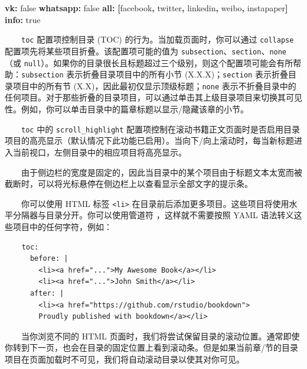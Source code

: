 \documentclass[
  12pt,
]{krantz}
\newenvironment{Shaded}{\begin{snugshade}}{\end{snugshade}}
\newcommand{\AttributeTok}[1]{\textcolor[rgb]{0.13,0.29,0.53}{#1}}
\newcommand{\CharTok}[1]{\textcolor[rgb]{0.31,0.60,0.02}{#1}}
\newcommand{\FunctionTok}[1]{\textcolor[rgb]{0.13,0.29,0.53}{\textbf{#1}}}
\newcommand{\KeywordTok}[1]{\textcolor[rgb]{0.13,0.29,0.53}{\textbf{#1}}}
\newcommand{\StringTok}[1]{\textcolor[rgb]{0.31,0.60,0.02}{#1}}
\theoremstyle{definition}
\theoremstyle{definition}
\theoremstyle{definition}
\theoremstyle{definition}
\theoremstyle{remark}
\begin{document}
\begin{Shaded}
\begin{Highlighting}[]
\AttributeTok{      }\FunctionTok{vk}\KeywordTok{:}\AttributeTok{ }\CharTok{false}
\AttributeTok{      }\FunctionTok{whatsapp}\KeywordTok{:}\AttributeTok{ }\CharTok{false}
\AttributeTok{      }\FunctionTok{all}\KeywordTok{:}\AttributeTok{ }\KeywordTok{[}\StringTok{\textquotesingle{}facebook\textquotesingle{}}\KeywordTok{,}\AttributeTok{ }\StringTok{\textquotesingle{}twitter\textquotesingle{}}\KeywordTok{,}\AttributeTok{ }\StringTok{\textquotesingle{}linkedin\textquotesingle{}}\KeywordTok{,}\AttributeTok{ }\StringTok{\textquotesingle{}weibo\textquotesingle{}}\KeywordTok{,}\AttributeTok{ }\StringTok{\textquotesingle{}instapaper\textquotesingle{}}\KeywordTok{]}
\AttributeTok{    }\FunctionTok{info}\KeywordTok{:}\AttributeTok{ }\CharTok{true}
\end{Highlighting}
\end{Shaded}

  \texttt{toc} 配置项控制目录 (TOC) 的行为。当加载页面时，你可以通过 \texttt{collapse} 配置项先将某些项目折叠。该配置项可能的值为 \texttt{subsection}、\texttt{section}、\texttt{none}（或 \texttt{null}）。如果你的目录很长且标题超过三个级别，则这个配置项可能会有所帮助：\texttt{subsection} 表示折叠目录项目中的所有小节 (X.X.X)；\texttt{section} 表示折叠目录项目中的所有节 (X.X)，因此最初仅显示顶级标题；\texttt{none} 表示不折叠目录中的任何项目。对于那些折叠的目录项目，可以通过单击其上级目录项目来切换其可见性。例如，你可以单击目录中的篇章标题以显示/隐藏该章的小节。

  \texttt{toc} 中的 \texttt{scroll\_highlight} 配置项控制在滚动书籍正文页面时是否启用目录项目的高亮显示（默认情况下此功能已启用）。当向下/向上滚动时，每当新标题进入当前视口，左侧目录中的相应项目将高亮显示。

  由于侧边栏的宽度是固定的，因此当目录中的某个项目由于标题文本太宽而被截断时，可以将光标悬停在侧边栏上以查看显示全部文字的提示条。

  你可以使用 HTML 标签 \texttt{\textless{}li\textgreater{}} 在目录前后添加更多项目。这些项目将使用水平分隔器与目录分开。你可以使用管道符 \texttt{\textbar{}}，这样就不需要按照 YAML 语法转义这些项目中的任何字符，例如：

\begin{verbatim}
    toc:
      before: |
        <li><a href="...">My Awesome Book</a></li>
        <li><a href="...">John Smith</a></li>
      after: |
        <li><a href="https://github.com/rstudio/bookdown">
        Proudly published with bookdown</a></li>
\end{verbatim}

  当你浏览不同的 HTML 页面时，我们将尝试保留目录的滚动位置。通常即使你转到下一页，也会在目录的固定位置上看到滚动条。但是如果当前章/节的目录项目在页面加载时不可见，我们将自动滚动目录以使其对你可见。
\end{document}
